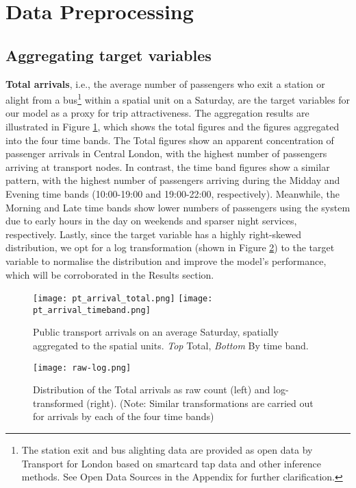 \pagebreak[4] %
\section{Data Preprocessing}
\subsection{Aggregating target variables}

\textbf{Total arrivals}, i.e., the average number of passengers who exit a station or alight from a bus\footnote{The station exit and bus alighting data are provided as open data by Transport for London based on smartcard tap data and other inference methods. See Open Data Sources in the Appendix for further clarification.} within a spatial unit on a Saturday, are the target variables for our model as a proxy for trip attractiveness. The aggregation results are illustrated in Figure \ref{fig:ptarrival}, which shows the total figures and the figures aggregated into the four time bands. The Total figures show an apparent concentration of passenger arrivals in Central London, with the highest number of passengers arriving at transport nodes. In contrast, the time band figures show a similar pattern, with the highest number of passengers arriving during the Midday and Evening time bands (10:00-19:00 and 19:00-22:00, respectively). Meanwhile, the Morning and Late time bands show lower numbers of passengers using the system due to early hours in the day on weekends and sparser night services, respectively. Lastly, since the target variable has a highly right-skewed distribution, we opt for a log transformation (shown in Figure \ref{fig:rawlog}) to the target variable to normalise the distribution and improve the model's performance, which will be corroborated in the Results section.

\begin{figure}[!ht]
    \centering
    \texttt{[image: pt\_arrival\_total.png]}
    \centering
    \texttt{[image: pt\_arrival\_timeband.png]}
    \captionsetup{justification=centering}
    \caption{Public transport arrivals on an average Saturday, spatially aggregated to the spatial units. \textit{Top} Total, \textit{Bottom} By time band.}
    \label{fig:ptarrival}
\end{figure}

\begin{figure}[!hb]
    \centering
    \texttt{[image: raw-log.png]}
    \captionsetup{justification=centering}
    \caption{Distribution of the Total arrivals as raw count (left) and log-transformed (right). (Note: Similar transformations are carried out for arrivals by each of the four time bands)}
    \label{fig:rawlog}
\end{figure}

